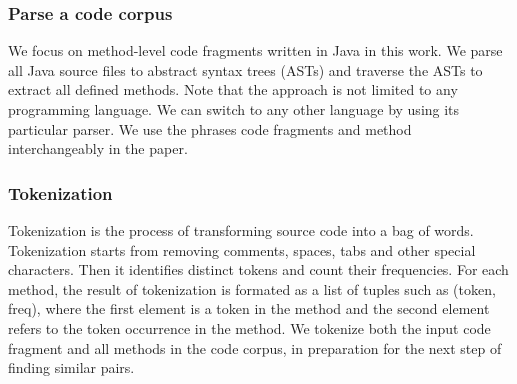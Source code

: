 \subsubsection{Parse a code corpus}
We focus on method-level code fragments written in Java in this work. We parse all Java source files to abstract syntax trees (ASTs) and traverse the ASTs to extract all defined methods. Note that the approach is not limited to any programming language. We can switch to any other language by using its particular parser. We use the phrases code fragments and method interchangeably in the paper.

\subsubsection{Tokenization}
Tokenization is the process of transforming source code into a bag of words. Tokenization starts from removing comments, spaces, tabs and other special characters. Then it identifies distinct tokens and count their frequencies. For each method, the result of tokenization is formated as a list of tuples such as {\ttt (token, freq)}, where the first element is a token in the method and the second element refers to the token occurrence in the method.
We tokenize both the input code fragment and all methods in the code corpus, in preparation for the next step of finding similar pairs.

